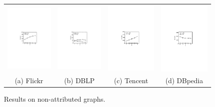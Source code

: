 \begin{figure}[htb]
\setlength{\abovecaptionskip}{0.cm}
\setlength{\belowcaptionskip}{-1cm}
\hspace*{-.4cm}
\centering
\begin{tabular}{c c c c}
  \begin{minipage}{3.36cm}
	\includegraphics[width=3.325cm]{figures/flickrDecComp}
  \end{minipage}
  &
  \begin{minipage}{3.36cm}
	\includegraphics[width=3.325cm]{figures/dblpDecComp}
  \end{minipage}
  &
  \begin{minipage}{3.36cm}
	\includegraphics[width=3.325cm]{figures/tencentDecComp}
  \end{minipage}
  &
  \begin{minipage}{3.36cm}
	\includegraphics[width=3.325cm]{figures/dbpediaDecComp}
  \end{minipage}
  \\
  \small (a) Flickr
  &
  \small (b) DBLP
  &
  \small (c) Tencent
  &
  \small (d) DBpedia
\end{tabular}
\caption{Results on non-attributed graphs.}
\label{fig:exp-more-decComp}
\end{figure}



